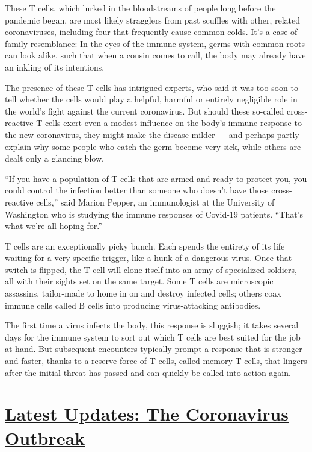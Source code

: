 These T cells, which lurked in the bloodstreams of people long before
the pandemic began, are most likely stragglers from past scuffles with
other, related coronaviruses, including four that frequently cause
\href{https://www.ncbi.nlm.nih.gov/pmc/articles/PMC3416289/}{common
colds}. It's a case of family resemblance: In the eyes of the immune
system, germs with common roots can look alike, such that when a cousin
comes to call, the body may already have an inkling of its intentions.

The presence of these T cells has intrigued experts, who said it was too
soon to tell whether the cells would play a helpful, harmful or entirely
negligible role in the world's fight against the current coronavirus.
But should these so-called cross-reactive T cells exert even a modest
influence on the body's immune response to the new coronavirus, they
might make the disease milder --- and perhaps partly explain why some
people who
\href{https://www.nytimes.com/2020/08/04/health/coronavirus-immune-system.html}{catch
the germ} become very sick, while others are dealt only a glancing blow.

``If you have a population of T cells that are armed and ready to
protect you, you could control the infection better than someone who
doesn't have those cross-reactive cells,'' said Marion Pepper, an
immunologist at the University of Washington who is studying the immune
responses of Covid-19 patients. ``That's what we're all hoping for.''

T cells are an exceptionally picky bunch. Each spends the entirety of
its life waiting for a very specific trigger, like a hunk of a dangerous
virus. Once that switch is flipped, the T cell will clone itself into an
army of specialized soldiers, all with their sights set on the same
target. Some T cells are microscopic assassins, tailor-made to home in
on and destroy infected cells; others coax immune cells called B cells
into producing virus-attacking antibodies.

The first time a virus infects the body, this response is sluggish; it
takes several days for the immune system to sort out which T cells are
best suited for the job at hand. But subsequent encounters typically
prompt a response that is stronger and faster, thanks to a reserve force
of T cells, called memory T cells, that lingers after the initial threat
has passed and can quickly be called into action again.

\hypertarget{latest-updates-the-coronavirus-outbreak}{%
\section{\texorpdfstring{\href{https://www.nytimes.com/2020/08/07/world/covid-19-news.html?action=click\&pgtype=Article\&state=default\&region=MAIN_CONTENT_1\&context=storylines_live_updates}{Latest
Updates: The Coronavirus
Outbreak}}{Latest Updates: The Coronavirus Outbreak}}\label{latest-updates-the-coronavirus-outbreak}}

